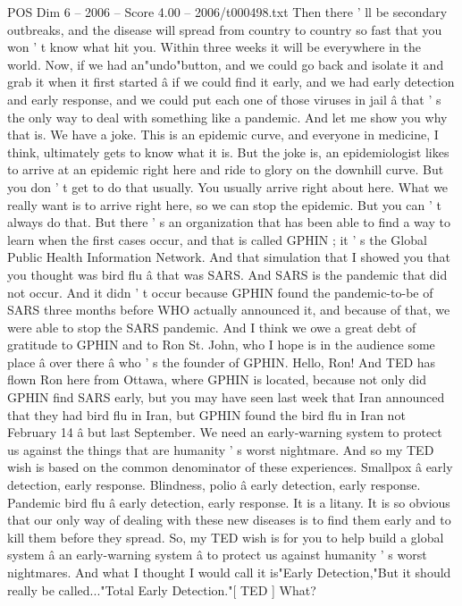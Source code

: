 \begin{textsample}{POS Dim 6 – 2006 – Score 4.00 – 2006/t000498.txt}
Then there ' ll be secondary outbreaks, and the disease will spread from country to country so fast that you won ' t know what hit you.
Within three weeks it will be everywhere in the world.
Now, if we had an"undo"button, and we could go back and isolate it and grab it when it first started â if we could find it early, and we had early detection and early response, and we could put each one of those viruses in jail â that ' s the only way to deal with something like a pandemic.
And let me show you why that is.
We have a joke.
This is an epidemic curve, and everyone in medicine, I think, ultimately gets to know what it is.
But the joke is, an epidemiologist likes to arrive at an epidemic right here and ride to glory on the downhill curve.
But you don ' t get to do that usually.
You usually arrive right about here.
What we really want is to arrive right here, so we can stop the epidemic.
But you can ' t always do that.
But there ' s an organization that has been able to find a way to learn when the first cases occur, and that is called GPHIN ; it ' s the Global Public Health Information Network.
And that simulation that I showed you that you thought was bird flu â that was SARS.
And SARS is the pandemic that did not occur.
And it didn ' t occur because GPHIN found the pandemic-to-be of SARS three months before WHO actually announced it, and because of that, we were able to stop the SARS pandemic.
And I think we owe a great debt of gratitude to GPHIN and to Ron St.
John, who I hope is in the audience some place â over there â who ' s the founder of GPHIN.
Hello, Ron!
And TED has flown Ron here from Ottawa, where GPHIN is located, because not only did GPHIN find SARS early, but you may have seen last week that Iran announced that they had bird flu in Iran, but GPHIN found the bird flu in Iran not February 14 â but last September.
We need an early-warning system to protect us against the things that are humanity ' s worst nightmare.
And so my TED wish is based on the common denominator of these experiences.
Smallpox â early detection, early response.
Blindness, polio â early detection, early response.
Pandemic bird flu â early detection, early response.
It is a litany.
It is so obvious that our only way of dealing with these new diseases is to find them early and to kill them before they spread.
So, my TED wish is for you to help build a global system â an early-warning system â to protect us against humanity ' s worst nightmares.
And what I thought I would call it is"Early Detection,"But it should really be called..."Total Early Detection."[ TED ] What?

\end{textsample}
